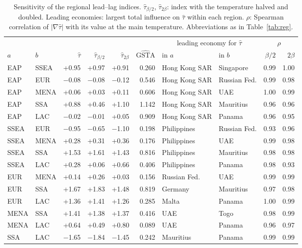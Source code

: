 \begin{table}[hp]
\caption{Sensitivity of the regional lead--lag indices. $\hat\tau_{\beta/2}$, $\hat\tau_{2\beta}$: index with the temperature halved and doubled. Leading economies: largest total influence on $\hat\tau$ within each region. $\rho$: Spearman correlation of $|\nabla\hat\tau|$ with its value at the main temperature. Abbreviations as in Table~\ref{tab:reg}.}\label{tab:regsens}
\centering\scriptsize
\begin{tabular}{llrrrrllrr}
\toprule
 & & & & & & \multicolumn{2}{c}{leading economy for $\hat\tau$} & \multicolumn{2}{c}{$\rho$}\\
\cmidrule(lr){7-8}\cmidrule(lr){9-10}
$a$ & $b$ & $\hat\tau$ & $\hat\tau_{\beta/2}$ & $\hat\tau_{2\beta}$ & $\widehat{\mathrm{GSTA}}$ & in $a$ & in $b$ & $\beta/2$ & $2\beta$\\
\midrule
EAP & SSEA & +0.95 & +0.97 & +0.91 & 0.260 & Hong Kong SAR & Singapore & 0.99 & 1.00\\
EAP & EUR & $-$0.08 & $-$0.08 & $-$0.12 & 0.546 & Hong Kong SAR & Russian Fed. & 0.99 & 0.98\\
EAP & MENA & +0.06 & +0.03 & +0.11 & 0.606 & Hong Kong SAR & UAE & 1.00 & 0.99\\
EAP & SSA & +0.88 & +0.46 & +1.10 & 1.142 & Hong Kong SAR & Mauritius & 0.96 & 0.96\\
EAP & LAC & $-$0.02 & $-$0.01 & +0.05 & 0.909 & Hong Kong SAR & Panama & 0.96 & 0.95\\
SSEA & EUR & $-$0.95 & $-$0.65 & $-$1.10 & 0.198 & Philippines & Russian Fed. & 0.93 & 0.96\\
SSEA & MENA & +0.28 & +0.31 & +0.36 & 0.176 & Philippines & UAE & 0.99 & 0.98\\
SSEA & SSA & +1.53 & +1.61 & +1.43 & 0.816 & Philippines & Mauritius & 0.98 & 0.98\\
SSEA & LAC & +0.28 & +0.06 & +0.66 & 0.406 & Philippines & Panama & 0.98 & 0.93\\
EUR & MENA & +0.14 & +0.26 & +0.03 & 0.156 & Russian Fed. & UAE & 0.99 & 0.99\\
EUR & SSA & +1.67 & +1.83 & +1.48 & 0.819 & Germany & Mauritius & 0.97 & 0.98\\
EUR & LAC & +1.36 & +1.41 & +1.26 & 0.285 & Malta & Panama & 1.00 & 0.99\\
MENA & SSA & +1.41 & +1.38 & +1.37 & 0.416 & UAE & Togo & 0.98 & 0.99\\
MENA & LAC & +0.64 & +0.49 & +0.80 & 0.089 & UAE & Panama & 0.96 & 0.97\\
SSA & LAC & $-$1.65 & $-$1.84 & $-$1.45 & 0.242 & Mauritius & Panama & 0.99 & 0.99\\
\bottomrule
\end{tabular}
\end{table}

